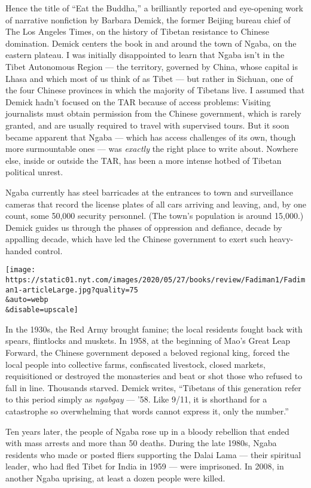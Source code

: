 Hence the title of ``Eat the Buddha,'' a brilliantly reported and
eye-opening work of narrative nonfiction by Barbara Demick, the former
Beijing bureau chief of The Los Angeles Times, on the history of Tibetan
resistance to Chinese domination. Demick centers the book in and around
the town of Ngaba, on the eastern plateau. I was initially disappointed
to learn that Ngaba isn't in the Tibet Autonomous Region --- the
territory, governed by China, whose capital is Lhasa and which most of
us think of as Tibet --- but rather in Sichuan, one of the four Chinese
provinces in which the majority of Tibetans live. I assumed that Demick
hadn't focused on the TAR because of access problems: Visiting
journalists must obtain permission from the Chinese government, which is
rarely granted, and are usually required to travel with supervised
tours. But it soon became apparent that Ngaba --- which has access
challenges of its own, though more surmountable ones --- was
\emph{exactly} the right place to write about. Nowhere else, inside or
outside the TAR, has been a more intense hotbed of Tibetan political
unrest.

Ngaba currently has steel barricades at the entrances to town and
surveillance cameras that record the license plates of all cars arriving
and leaving, and, by one count, some 50,000 security personnel. (The
town's population is around 15,000.) Demick guides us through the phases
of oppression and defiance, decade by appalling decade, which have led
the Chinese government to exert such heavy-handed control.

\texttt{[image: https://static01.nyt.com/images/2020/05/27/books/review/Fadiman1/Fadiman1-articleLarge.jpg?quality=75\\\&auto=webp\\\&disable=upscale]}

In the 1930s, the Red Army brought famine; the local residents fought
back with spears, flintlocks and muskets. In 1958, at the beginning of
Mao's Great Leap Forward, the Chinese government deposed a beloved
regional king, forced the local people into collective farms,
confiscated livestock, closed markets, requisitioned or destroyed the
monasteries and beat or shot those who refused to fall in line.
Thousands starved. Demick writes, ``Tibetans of this generation refer to
this period simply as \emph{ngabgay} --- '58. Like 9/11, it is shorthand
for a catastrophe so overwhelming that words cannot express it, only the
number.''

Ten years later, the people of Ngaba rose up in a bloody rebellion that
ended with mass arrests and more than 50 deaths. During the late 1980s,
Ngaba residents who made or posted fliers supporting the Dalai Lama ---
their spiritual leader, who had fled Tibet for India in 1959 --- were
imprisoned. In 2008, in another Ngaba uprising, at least a dozen people
were killed.

